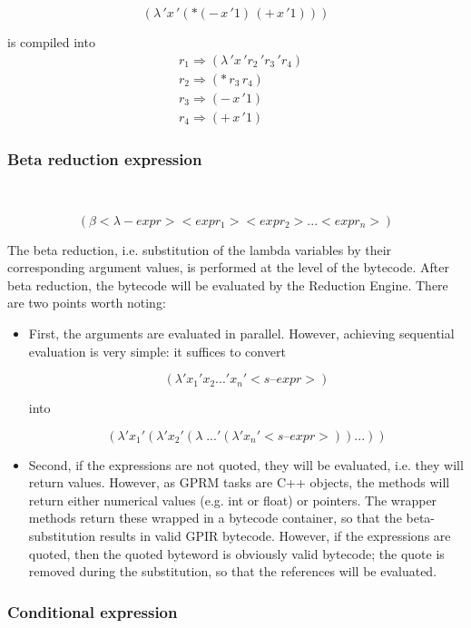 \documentclass[copyright,creativecommons]{eptcs}
\begin{document}
\[
(\lambda\,'x\,'(*(-\, x\,'1)\,(+\, x\,'1)))
\]


is compiled into
\begin{align*}
 & r_{1}\Rightarrow(\lambda\,'x\,'r_{2}\,'r_{3}\,'r_{4})\\
 & r_{2}\Rightarrow(*\, r_{3}\, r_{4})\\
 & r_{3}\Rightarrow(-\, x\,'1)\\
 & r_{4}\Rightarrow(+\, x\,'1)
\end{align*}



\subsubsection{Beta reduction expression}

~

\[
(\beta<\lambda-expr><expr_{1}><expr_{2}>...<expr_{n}>)
\]


The beta reduction, i.e. substitution of the lambda variables by their
corresponding argument values, is performed at the level of the bytecode.
After beta reduction, the bytecode will be evaluated by the Reduction
Engine. There are two points worth noting: 
\begin{itemize}
\item First, the arguments are evaluated in parallel. However, achieving
sequential evaluation is very simple: it suffices to convert


\[
(\lambda'x_{1}'x_{2}...'x_{n}'<s\text{–}expr>)
\]
 


into 


\[
(\lambda'x_{1}'(\lambda'x_{2}'(\lambda\;...'(\lambda'x_{n}'<s\text{–}expr>))...))
\]


\item Second, if the expressions are not quoted, they will be evaluated,
i.e. they will return values. However, as GPRM tasks are C++ objects,
the methods will return either numerical values (e.g. int or float)
or pointers. The wrapper methods return these wrapped in a bytecode
container, so that the beta-substitution results in valid GPIR bytecode.
However, if the expressions are quoted, then the quoted byteword is
obviously valid bytecode; the quote is removed during the substitution,
so that the references will be evaluated.
\end{itemize}

\subsubsection{Conditional expression}
\end{document}
